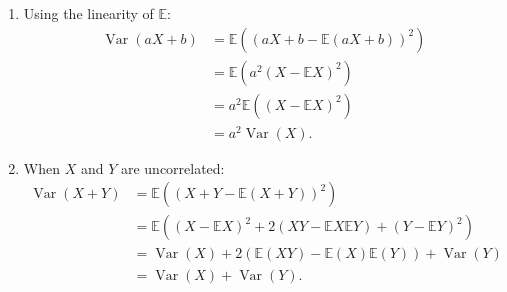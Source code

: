 \documentclass{huhtakm-template-book-v2}
\newcommand{\expect}{\mathbb{E}}
\DeclareMathOperator{\Var}{Var}
\begin{document}
    \begin{proofing}
        \begin{enumerate}
            \item Using the linearity of $\expect$:
            \begin{align*}
                \Var(aX+b) &= \expect((aX+b-\expect(aX+b))^{2})\\
                &= \expect(a^{2}(X-\expect{X})^{2})\\
                &= a^{2}\expect((X-\expect{X})^{2})\\
                &= a^{2}\Var(X).
            \end{align*}
            \item When $X$ and $Y$ are uncorrelated:
            \begin{align*}
                \Var(X+Y) &= \expect((X+Y-\expect(X+Y))^{2})\\
                &= \expect((X-\expect{X})^{2}+2(XY-\expect{X}\expect{Y})+(Y-\expect{Y})^{2})\\
                &= \Var(X)+2(\expect(XY)-\expect(X)\expect(Y))+\Var(Y)\\
                &= \Var(X)+\Var(Y).
            \end{align*}
        \end{enumerate}
    \end{proofing}
    \newpage
\end{document}
